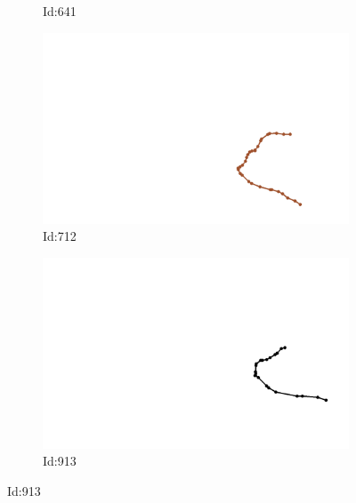 \documentclass[12pt,twoside]{report}
\begin{document}
\begin{figure}
\begin{subfigure}[b]{0.20\textwidth}
\caption{Id:641}
\end{subfigure}
\begin{subfigure}[b]{0.20\textwidth}
\centering
\includegraphics[width=\textwidth]{../../trajectories/712.png}
\caption{Id:712}
\end{subfigure}
\begin{subfigure}[b]{0.20\textwidth}
\centering
\includegraphics[width=\textwidth]{../../trajectories/913.png}
\caption{Id:913}
\end{subfigure}
\end{figure}
\end{document}

